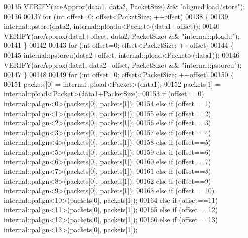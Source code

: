\begin{DoxyCode}
00135   VERIFY(areApprox(data1, data2, PacketSize) && \textcolor{stringliteral}{"aligned load/store"});
00136 
00137   \textcolor{keywordflow}{for} (\textcolor{keywordtype}{int} offset=0; offset<PacketSize; ++offset)
00138   \{
00139     internal::pstore(data2, internal::ploadu<Packet>(data1+offset));
00140     VERIFY(areApprox(data1+offset, data2, PacketSize) && \textcolor{stringliteral}{"internal::ploadu"});
00141   \}
00142 
00143   \textcolor{keywordflow}{for} (\textcolor{keywordtype}{int} offset=0; offset<PacketSize; ++offset)
00144   \{
00145     internal::pstoreu(data2+offset, internal::pload<Packet>(data1));
00146     VERIFY(areApprox(data1, data2+offset, PacketSize) && \textcolor{stringliteral}{"internal::pstoreu"});
00147   \}
00148 
00149   \textcolor{keywordflow}{for} (\textcolor{keywordtype}{int} offset=0; offset<PacketSize; ++offset)
00150   \{
00151     packets[0] = internal::pload<Packet>(data1);
00152     packets[1] = internal::pload<Packet>(data1+PacketSize);
00153          \textcolor{keywordflow}{if} (offset==0) internal::palign<0>(packets[0], packets[1]);
00154     \textcolor{keywordflow}{else} \textcolor{keywordflow}{if} (offset==1) internal::palign<1>(packets[0], packets[1]);
00155     \textcolor{keywordflow}{else} \textcolor{keywordflow}{if} (offset==2) internal::palign<2>(packets[0], packets[1]);
00156     \textcolor{keywordflow}{else} \textcolor{keywordflow}{if} (offset==3) internal::palign<3>(packets[0], packets[1]);
00157     \textcolor{keywordflow}{else} \textcolor{keywordflow}{if} (offset==4) internal::palign<4>(packets[0], packets[1]);
00158     \textcolor{keywordflow}{else} \textcolor{keywordflow}{if} (offset==5) internal::palign<5>(packets[0], packets[1]);
00159     \textcolor{keywordflow}{else} \textcolor{keywordflow}{if} (offset==6) internal::palign<6>(packets[0], packets[1]);
00160     \textcolor{keywordflow}{else} \textcolor{keywordflow}{if} (offset==7) internal::palign<7>(packets[0], packets[1]);
00161     \textcolor{keywordflow}{else} \textcolor{keywordflow}{if} (offset==8) internal::palign<8>(packets[0], packets[1]);
00162     \textcolor{keywordflow}{else} \textcolor{keywordflow}{if} (offset==9) internal::palign<9>(packets[0], packets[1]);
00163     \textcolor{keywordflow}{else} \textcolor{keywordflow}{if} (offset==10) internal::palign<10>(packets[0], packets[1]);
00164     \textcolor{keywordflow}{else} \textcolor{keywordflow}{if} (offset==11) internal::palign<11>(packets[0], packets[1]);
00165     \textcolor{keywordflow}{else} \textcolor{keywordflow}{if} (offset==12) internal::palign<12>(packets[0], packets[1]);
00166     \textcolor{keywordflow}{else} \textcolor{keywordflow}{if} (offset==13) internal::palign<13>(packets[0], packets[1]);

\end{DoxyCode}

